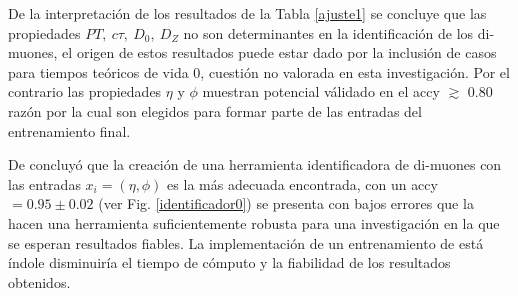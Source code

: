 De la interpretación de los resultados de la Tabla \ref{ajuste1} se concluye que las propiedades $PT, ~ c\tau, ~ D_0, ~D_Z$ no son determinantes en la identificación de los di-muones, el origen de estos resultados puede estar dado por la inclusión de casos para tiempos teóricos de vida 0, cuestión no valorada en esta investigación. Por el contrario las propiedades $\eta$ y $\phi$ muestran potencial válidado en el \textsf{accy} $\gtrsim$ 0.80 razón por la cual son elegidos para formar parte de las entradas del entrenamiento final. 

De concluyó que la creación de una herramienta identificadora de di-muones con las entradas $x_i=(\eta,\phi)$ es la más adecuada encontrada, con un \textsf{accy} $= 0.95 \pm 0.02$ (ver Fig. \ref{identificador0}) se presenta con bajos errores que la hacen una herramienta suficientemente robusta para una investigación en la que se esperan resultados fiables. La implementación de un entrenamiento de está índole disminuiría el tiempo de cómputo y la fiabilidad de los resultados obtenidos.















